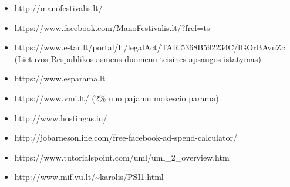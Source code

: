 ﻿\documentclass{VUMIFPSkursinis}
\begin{document}
\begin{itemize}
\item http://manofestivalis.lt/
\item https://www.facebook.com/ManoFestivalis.lt/?fref=ts
\item https://www.e-tar.lt/portal/lt/legalAct/TAR.5368B592234C/lGOrBAvuZc (Lietuvos Respublikos asmens duomenu teisines apsaugos istatymas)
\item https://www.esparama.lt
\item https://www.vmi.lt/ (2\% nuo pajamu mokescio parama)
\item http://www.hostingas.in/
\item http://jobarnesonline.com/free-facebook-ad-spend-calculator/
\item https://www.tutorialspoint.com/uml/uml\_2\_overview.htm
\item http://www.mif.vu.lt/\textasciitilde karolis/PSI1.html
\end{itemize}


%
%
\end{document}
